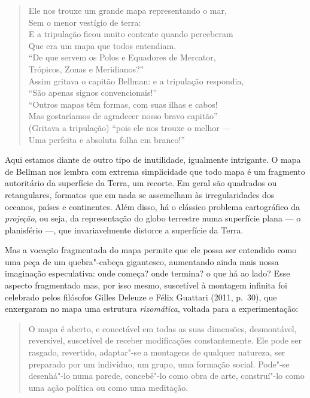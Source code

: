 \begin{verse}
Ele nos trouxe um grande mapa \qb{}representando o mar,\\
Sem o menor vestígio de terra:\\
E a tripulação ficou muito contente \qb{}quando perceberam\\
Que era um mapa que todos entendiam.\\[5pt]
``De que servem os Polos e Equadores \qb{}de Mercator,\\
Trópicos, Zonas e Meridianos?''\\
Assim gritava o capitão Bellman: e a \qb{}tripulação respondia,\\
``São apenas signos convencionais!''\\[5pt]
``Outros mapas têm formas, com suas \qb{}ilhas e cabos!\\
Mas gostaríamos de agradecer nosso \qb{}bravo capitão''\\
(Gritava a tripulação) ``pois ele nos \qb{}trouxe o melhor ---\\
Uma perfeita e absoluta folha em \qb{}branco!''
\end{verse}

Aqui estamos diante de outro tipo de inutilidade, igualmente intrigante.
O mapa de Bellman nos lembra com extrema simplicidade que todo mapa é um
fragmento autoritário da superfície da Terra, um recorte. Em geral são
quadrados ou retangulares, formatos que em nada se assemelham às
irregularidades dos oceanos, países e continentes. Além disso, há o
clássico problema cartográfico da \emph{projeção}, ou seja, da
representação do globo terrestre numa superfície plana --- o planisfério
---, que invariavelmente distorce a superfície da Terra.

Mas a vocação fragmentada do mapa permite que ele possa ser entendido
como uma peça de um quebra"-cabeça gigantesco, aumentando ainda mais
nossa imaginação especulativa: onde começa? onde termina? o que há ao
lado? Esse aspecto fragmentado mas, por isso mesmo, suscetível à
montagem infinita foi celebrado pelos filósofos Gilles Deleuze e Félix Guattari (2011, p.~30), que enxergaram no mapa uma estrutura
\emph{rizomática}, voltada para a experimentação:

\begin{quote}
O mapa é aberto, e conectável em todas as suas dimensões, desmontável,
reversível, suscetível de receber modificações constantemente. Ele pode
ser rasgado, revertido, adaptar"-se a montagens de qualquer natureza, ser
preparado por um indivíduo, um grupo, uma formação social. Pode"-se
desenhá"-lo numa parede, concebê"-lo como obra de arte, construí"-lo como
uma ação política ou como uma meditação.
\end{quote}

